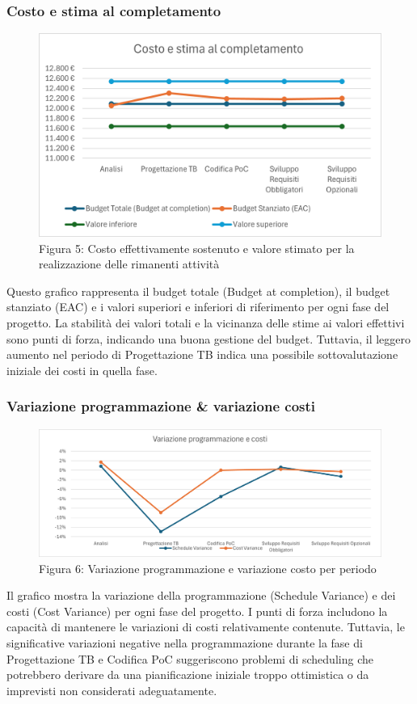 \documentclass{article}
\begin{document}
\subsubsection{Costo e stima al completamento}
    
    \begin{figure}[H]
    \centering
    \includegraphics{documenti/grafici/CostoEStimaAlCompletamentoPB.png}
    \caption{Figura 5: Costo effettivamente sostenuto e valore stimato per la realizzazione delle rimanenti attività}
\end{figure}
Questo grafico rappresenta il budget totale (Budget at completion), il budget stanziato (EAC) e i valori superiori e inferiori di riferimento per ogni fase del progetto. La stabilità dei valori totali e la vicinanza delle stime ai valori effettivi sono punti di forza, indicando una buona gestione del budget. Tuttavia, il leggero aumento nel periodo di Progettazione TB indica una possibile sottovalutazione iniziale dei costi in quella fase.

\subsubsection{Variazione programmazione \& variazione costi}
\begin{figure}[H]
    \centering
    \includegraphics[width=\textwidth]{documenti/grafici/VariazioneProgrammazioneECostiPB.png}
    \caption{Figura 6: Variazione programmazione e variazione costo per periodo}
    \end{figure}
    Il grafico mostra la variazione della programmazione (Schedule Variance) e dei costi (Cost Variance) per ogni fase del progetto. I punti di forza includono la capacità di mantenere le variazioni di costi relativamente contenute. Tuttavia, le significative variazioni negative nella programmazione durante la fase di Progettazione TB e Codifica PoC suggeriscono problemi di scheduling che potrebbero derivare da una pianificazione iniziale troppo ottimistica o da imprevisti non considerati adeguatamente.
\end{document}
